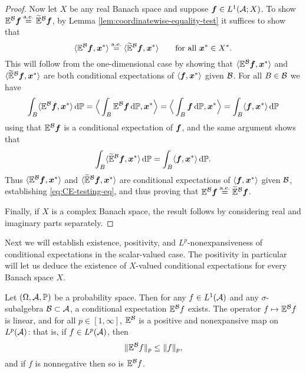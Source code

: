 \begin{proof}
  Now let $X$ be any real Banach space and suppose $\bm{f} \in L^1(\mathcal{A};X)$.
  To show $\mathbb{E}^{\mathcal{B}} \bm{f} \stackrel{\mathrm{a.e.}}{=} \widetilde{\mathbb{E}}^{\mathcal{B}} \bm{f}$, by Lemma \ref{lem:coordinatewise-equality-test} it suffices to show that
  \begin{equation}\label{eq:CE-testing-eq}
    \langle \mathbb{E}^{\mathcal{B}} \bm{f}, \bm{x}^* \rangle \stackrel{\mathrm{a.e.}}{=} \langle \widetilde{\mathbb{E}}^{\mathcal{B}} \bm{f}, \bm{x}^* \rangle \qquad \text{for all $\bm{x}^* \in X^*$.}
  \end{equation}
  This will follow from the one-dimensional case by showing that $\langle \mathbb{E}^{\mathcal{B}} \bm{f}, \bm{x}^* \rangle$ and $\langle \widetilde{\mathbb{E}}^{\mathcal{B}} \bm{f}, \bm{x}^* \rangle$ are both conditional expectations of $\langle \bm{f}, \bm{x}^* \rangle$ given $\mathcal{B}$.
  For all $B \in \mathcal{B}$ we have
  \begin{equation*}
    \int_B \langle \mathbb{E}^{\mathcal{B}} \bm{f}, \bm{x}^* \rangle \, \mathrm{d}\mathbb{P}
    = \Big\langle \int_B \mathbb{E}^{\mathcal{B}} \bm{f} \, \mathrm{d}\mathbb{P}, \bm{x}^* \Big\rangle
    = \Big\langle \int_B \bm{f} \, \mathrm{d}\mathbb{P}, \bm{x}^* \Big\rangle
    = \int_B \langle \bm{f}, \bm{x}^* \rangle \, \mathrm{d}\mathbb{P}
  \end{equation*}
  using that $\mathbb{E}^{\mathcal{B}}\bm{f}$ is a conditional expectation of $\bm{f}$, and the same argument shows that
  \begin{equation*}
    \int_B \langle \widetilde{\mathbb{E}}^{\mathcal{B}} \bm{f}, \bm{x}^* \rangle \, \mathrm{d}\mathbb{P} = \int_B \langle \bm{f}, \bm{x}^* \rangle \, \mathrm{d}\mathbb{P}.
  \end{equation*}
  Thus $\langle \mathbb{E}^{\mathcal{B}} \bm{f}, \bm{x}^* \rangle$ and $\langle \widetilde{\mathbb{E}}^{\mathcal{B}} \bm{f}, \bm{x}^* \rangle$ are conditional expectations of $\langle \bm{f}, \bm{x}^* \rangle$ given $\mathcal{B}$, establishing \eqref{eq:CE-testing-eq}, and thus proving that $\mathbb{E}^{\mathcal{B}} \bm{f} \stackrel{\mathrm{a.e.}}{=} \widetilde{\mathbb{E}}^{\mathcal{B}} \bm{f}$.

  Finally, if $X$ is a complex Banach space, the result follows by considering real and imaginary parts separately.
\end{proof}

Next we will establish existence, positivity, and $L^p$-nonexpansiveness of conditional expectations in the scalar-valued case.
The positivity in particular will let us deduce the existence of $X$-valued conditional expectations for every Banach space $X$.

\begin{thm}\label{thm:conditional-expectation-existence-scalar}
  Let $(\Omega,\mathcal{A},\mathbb{P})$ be a probability space.
  Then for any $f \in L^1(\mathcal{A})$ and any $\sigma$-subalgebra $\mathcal{B} \subset \mathcal{A}$, a conditional expectation $\mathbb{E}^{\mathcal{B}}f$ exists.
  The operator $f \mapsto \mathbb{E}^{\mathcal{B}}f$ is linear, and for all $p \in [1,\infty]$, $\mathbb{E}^{\mathcal{B}}$ is a positive and nonexpansive map on $L^p(\mathcal{A})$: that is, if $f \in L^p(\mathcal{A})$, then
  \begin{equation*}
    \|\mathbb{E}^{\mathcal{B}}f\|_{p} \leq \|f\|_{p},
  \end{equation*}
  and if $f$ is nonnegative then so is $\mathbb{E}^{\mathcal{B}}f$.
\end{thm}

